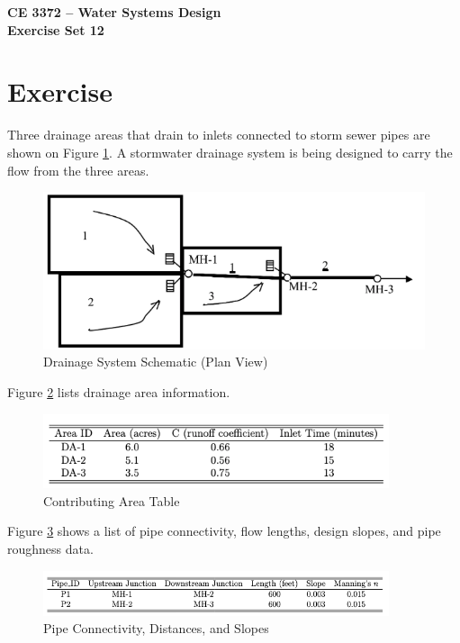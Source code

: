 \documentclass[12pt]{article}
\begin{document}
\begin{center}
{\textbf{{CE 3372 -- Water Systems Design} \\ {Exercise Set 12}}}
\end{center}

\section*{\small{Exercise}}

Three drainage areas that drain to inlets connected to storm sewer pipes are shown on Figure \ref{fig:drainage-schematic}. 
A stormwater drainage system is being designed to carry the flow from the three areas. 

\begin{figure}[h!] %
   \centering
   \includegraphics[width=6in]{DrainageSystemLayout.png} 
   \caption{Drainage System Schematic (Plan View)}
   \label{fig:drainage-schematic}
\end{figure}

Figure \ref{fig:contributingarea} lists drainage area information.
\begin{figure}[h!] %
   \centering
   \includegraphics[width=4in]{ContributingArea.png} 
   \caption{Contributing Area Table}
   \label{fig:contributingarea}
\end{figure}

Figure \ref{fig:pipedata} shows a list of pipe connectivity, flow lengths, design slopes, and pipe roughness data.
\begin{figure}[h!] %
   \centering
   \includegraphics[width=4in]{PipeData.png} 
   \caption{Pipe Connectivity, Distances, and Slopes}
   \label{fig:pipedata}
\end{figure}
\end{document}
